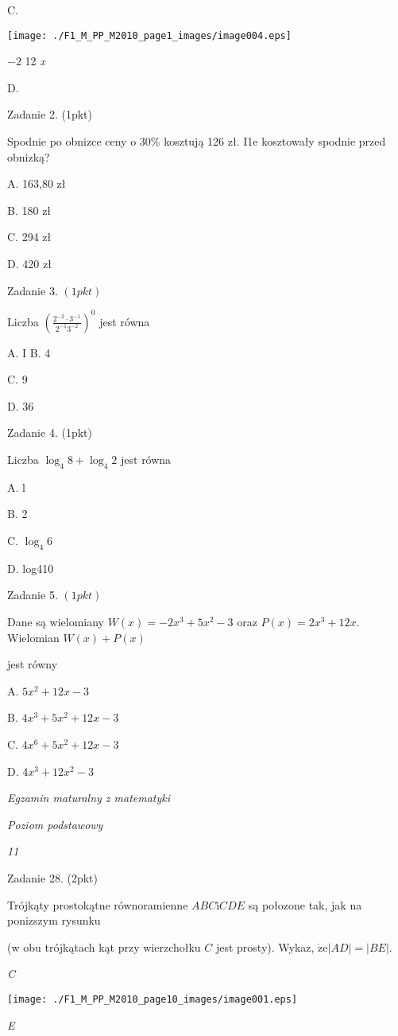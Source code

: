 \documentclass[a4paper,12pt]{article}
\begin{document}
C.
\begin{center}
\texttt{[image: ./F1\_M\_PP\_M2010\_page1\_images/image004.eps]}
\end{center}
$-2$  12  {\it x}

D.

Zadanie 2. (1pkt)

Spodnie po obnizce ceny o 30\% kosztują 126 zł. I1e kosztowały spodnie przed obnizką?

A. 163,80 zł

B. 180 zł

C. 294 zł

D. 420 zł

Zadanie 3. $(1pkt)$

Liczba $(\displaystyle \frac{2^{-2}\cdot 3^{-1}}{2^{-1}3^{-2}})^{0}$ jest równa

A. I B. 4

C. 9

D. 36

Zadanie 4. (1pkt)

Liczba $\log_{4}8+\log_{4}2$ jest równa

A. l

B. 2

C. $\log_{4}6$

D. log410

Zadanie 5. $(1pkt)$

Dane są wielomiany $W(x)=-2x^{3}+5x^{2}-3$ oraz $P(x)=2x^{3}+12x$. Wielomian $W(x)+P(x)$

jest równy

A. $5x^{2}+12x-3$

B. $4x^{3}+5x^{2}+12x-3$

C. $4x^{6}+5x^{2}+12x-3$

D. $4x^{3}+12x^{2}-3$





{\it Egzamin maturalny z matematyki}

{\it Poziom podstawowy}

{\it 11}

Zadanie 28. (2pkt)

Trójkąty prostokątne równoramienne $ABC\mathrm{i}CDE$ są połozone tak, jak na ponizszym rysunku

(w obu trójkątach kąt przy wierzchołku $C$ jest prosty). Wykaz, $\dot{\mathrm{z}}\mathrm{e}|AD|=|BE|.$

{\it C}
\begin{center}
\texttt{[image: ./F1\_M\_PP\_M2010\_page10\_images/image001.eps]}
\end{center}
{\it E}
\end{document}
